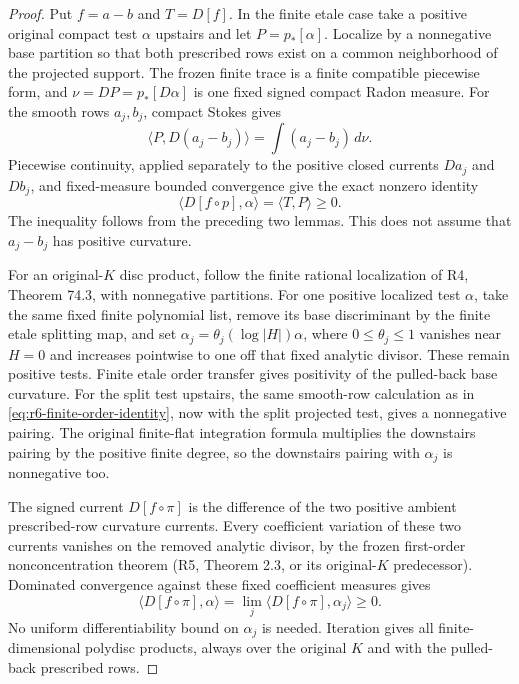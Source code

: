 \documentclass[11pt,a4paper]{article}
\numberwithin{equation}{section}
\theoremstyle{definition}
\theoremstyle{remark}
\begin{document}
\begin{proof}
Put $f=a-b$ and $T=D[f]$. In the finite etale case take a positive
original compact test $\alpha$ upstairs and let $P=p_*[\alpha]$.
Localize by a nonnegative base partition so that both prescribed
rows exist on a common neighborhood of the projected support.
The frozen finite trace is a finite compatible piecewise form, and
$\nu=DP=p_*[D\alpha]$ is one fixed signed compact Radon measure.
For the smooth rows $a_j,b_j$, compact Stokes gives
\[
 \langle P,D(a_j-b_j)\rangle=\int(a_j-b_j)\,d\nu.
\]
Piecewise continuity, applied separately to the positive closed
currents $Da_j$ and $Db_j$, and fixed-measure bounded convergence
give the exact nonzero identity
\begin{equation}
             \langle D[f\circ p],\alpha\rangle
                         =\langle T,P\rangle\geq0.
 \label{eq:r6-finite-order-identity}
\end{equation}
The inequality follows from the preceding two lemmas. This does
not assume that $a_j-b_j$ has positive curvature.

For an original-$K$ disc product, follow the finite rational
localization of R4, Theorem 74.3, with nonnegative partitions.
For one positive localized test $\alpha$, take the same fixed
finite polynomial list, remove its base discriminant by the finite
etale splitting map, and set $\alpha_j=\theta_j(\log|H|)\alpha$,
where $0\leq\theta_j\leq1$ vanishes near $H=0$ and increases
pointwise to one off that fixed analytic divisor. These remain
positive tests. Finite etale order transfer gives positivity of
the pulled-back base curvature. For the split test upstairs, the
same smooth-row calculation as in
\eqref{eq:r6-finite-order-identity}, now with the split projected
test, gives a nonnegative pairing. The original finite-flat
integration formula multiplies the downstairs pairing by the
positive finite degree, so the downstairs pairing with $\alpha_j$
is nonnegative too.

The signed current $D[f\circ\pi]$ is the difference of the two
positive ambient prescribed-row curvature currents. Every coefficient
variation of these two currents vanishes on the removed analytic
divisor, by the frozen first-order nonconcentration theorem (R5,
Theorem 2.3, or its original-$K$ predecessor). Dominated convergence
against these fixed coefficient measures gives
\[
 \langle D[f\circ\pi],\alpha\rangle
   =\lim_j\langle D[f\circ\pi],\alpha_j\rangle\geq0.
\]
No uniform differentiability bound on $\alpha_j$ is needed.
Iteration gives all finite-dimensional polydisc products, always
over the original $K$ and with the pulled-back prescribed rows.
\end{proof}
\end{document}
